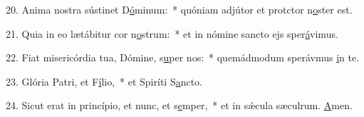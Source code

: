 20. Anima nostra sústinet D\uline{ó}minum:~* quóniam adjútor et protctor n\uline{o}ster est.\par 
21. Quia in eo lætábitur cor n\uline{o}strum:~* et in nómine sancto ejs sper\uline{á}vimus.\par 
22. Fiat misericórdia tua, Dómine, s\uline{u}per nos:~* quemádmodum sperávmus \uline{i}n te.\par 
23. Glória Patri, et F\uline{í}lio,~* et Spiríti S\uline{a}ncto.\par 
24. Sicut erat in princípio, et nunc, et s\uline{e}mper,~* et in sǽcula sæculrum. \uline{A}men.\par 
